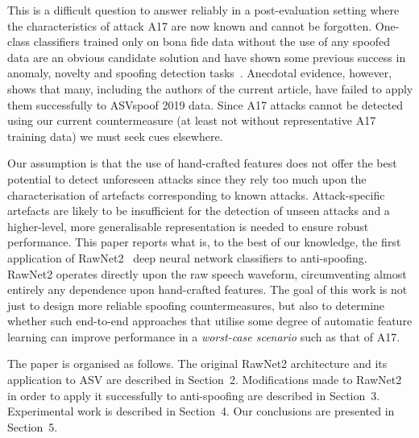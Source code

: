 This is a difficult question to answer reliably in a post-evaluation setting where the characteristics of attack A17 are now known and cannot be forgotten. One-class classifiers trained only on bona fide data without the use of any spoofed data are an obvious candidate solution and have shown some previous success in anomaly, novelty and spoofing detection tasks~\cite{EURECOM+4093,fatemifar2019spoofing,fatemifar2019combining,ohki2019efficient}. Anecdotal evidence, however, shows that many, including the authors of the current article, have failed to apply them successfully to ASVspoof 2019 data. Since A17 attacks cannot be detected using our current countermeasure (at least not without representative A17 training data) we must seek cues elsewhere. 

Our assumption is that the use of hand-crafted features does not offer the best potential to detect unforeseen attacks since they rely too much upon the characterisation of artefacts corresponding to known attacks. Attack-specific artefacts are likely to be insufficient for the detection of unseen attacks and a higher-level, more generalisable representation is needed to ensure robust performance. This paper reports what is, to the best of our knowledge, the first application of RawNet2~\cite{jung2020improved} deep neural network classifiers to anti-spoofing. RawNet2 operates directly upon the raw speech waveform, circumventing almost entirely any dependence upon hand-crafted features. The goal of this work is not just to design more reliable spoofing countermeasures, but also to determine whether such end-to-end approaches that utilise some degree of automatic feature learning can improve performance in a \emph{worst-case scenario} such as that of A17.

The paper is organised as follows. The original RawNet2 architecture and its application to ASV are described in Section~2. Modifications made to RawNet2 in order to apply it successfully to anti-spoofing are described in Section~3. Experimental work is described in Section~4. Our conclusions are presented in Section~5.